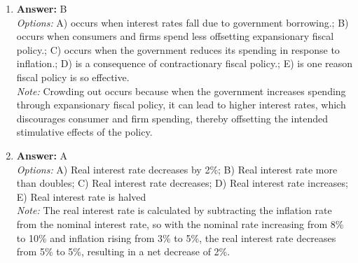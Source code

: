 \documentclass[12pt]{article}
\begin{document}
\begin{enumerate}[label=\arabic*.]
\item \textbf{Answer:} B
\\ \textit{Options:} A) occurs when interest rates fall due to government borrowing.; B) occurs when consumers and firms spend less offsetting expansionary fiscal policy.; C) occurs when the government reduces its spending in response to inflation.; D) is a consequence of contractionary fiscal policy.; E) is one reason fiscal policy is so effective.
\\ \textit{Note:} Crowding out occurs because when the government increases spending through expansionary fiscal policy, it can lead to higher interest rates, which discourages consumer and firm spending, thereby offsetting the intended stimulative effects of the policy.
\item \textbf{Answer:} A
\\ \textit{Options:} A) Real interest rate decreases by 2\%; B) Real interest rate more than doubles; C) Real interest rate decreases; D) Real interest rate increases; E) Real interest rate is halved
\\ \textit{Note:} The real interest rate is calculated by subtracting the inflation rate from the nominal interest rate, so with the nominal rate increasing from 8\% to 10\% and inflation rising from 3\% to 5\%, the real interest rate decreases from 5\% to 5\%, resulting in a net decrease of 2\%.
\end{enumerate}
\end{document}
